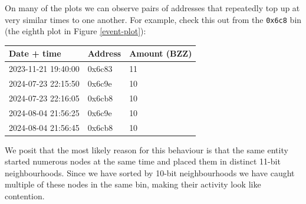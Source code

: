 On many of the plots we can observe pairs of addresses that repeatedly top up at very similar times to one another.
%
For example, check this out from the {\texttt{0x6c8}} bin (the eighth plot in Figure \ref{event-plot}):
%
\begin{center}
\begin{tabular}{lll}
Date + time         & Address & Amount (BZZ) \\
\hline
2023-11-21 19:40:00 & 0x6c83 &   11 \\
2024-07-23 22:15:50 &	0x6c9e  &	10 \\
2024-07-23 22:16:05 &	0x6cb8  &	10 \\
2024-08-04 21:56:25 &	0x6c9e  &	10 \\
2024-08-04 21:56:45 &	0x6cb8  &	10
\end{tabular}
\end{center}
%
We posit that the most likely reason for this behaviour is that the same entity started numerous nodes at the same time and placed them in distinct 11-bit neighbourhoods.
%
Since we have sorted by 10-bit neighbourhoods we have caught multiple of these nodes in the same bin, making their activity look like contention.